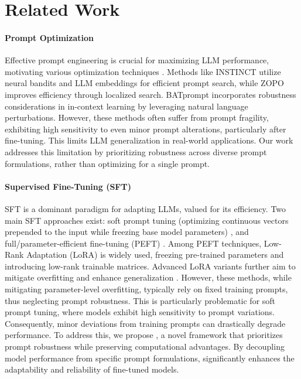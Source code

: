 \section{Related Work}
\label{sec:related_work}
\paragraph{Prompt Optimization}
Effective prompt engineering is crucial for maximizing LLM performance, motivating various optimization techniques \cite{chang2024efficient, li-2023-practical, diao2023blackbox, sun2022bbt}. Methods like INSTINCT \cite{lin2024use} utilize neural bandits and LLM embeddings for efficient prompt search, while ZOPO \cite{hu2024localized} improves efficiency through localized search. BATprompt \cite{shi2024robustnessawareautomaticpromptoptimization} incorporates robustness considerations in in-context learning by leveraging natural language perturbations. However, these methods often suffer from prompt fragility, exhibiting high sensitivity to even minor prompt alterations, particularly after fine-tuning. This limits LLM generalization in real-world applications. Our work addresses this limitation by prioritizing robustness across diverse prompt formulations, rather than optimizing for a single prompt.

\paragraph{Supervised Fine-Tuning (SFT)}
SFT is a dominant paradigm for adapting LLMs, valued for its efficiency. Two main SFT approaches exist: soft prompt tuning (optimizing continuous vectors prepended to the input while freezing base model parameters) \cite{li-liang-2021-prefix, liu-etal-2022-p}, and full/parameter-efficient fine-tuning (PEFT) \cite{shu2024ferret, ouyang2022training, liu2021pretrainpromptpredictsystematic, lester-etal-2021-power}. Among PEFT techniques, Low-Rank Adaptation (LoRA) \cite{hu2022lora} is widely used, freezing pre-trained parameters and introducing low-rank trainable matrices. Advanced LoRA variants further aim to mitigate overfitting and enhance generalization \cite{chen2023lorashearefficientlargelanguage, si2024unleashingpowertaskspecificdirections, wei2024flexora}.  However, these methods, while mitigating parameter-level overfitting, typically rely on fixed training prompts, thus neglecting prompt robustness. This is particularly problematic for soft prompt tuning, where models exhibit high sensitivity to prompt variations. Consequently, minor deviations from training prompts can drastically degrade performance. To address this, we propose \ours{}, a novel framework that prioritizes prompt robustness while preserving  computational advantages. By decoupling model performance from specific prompt formulations, \ours{} significantly enhances the adaptability and reliability of fine-tuned models.

